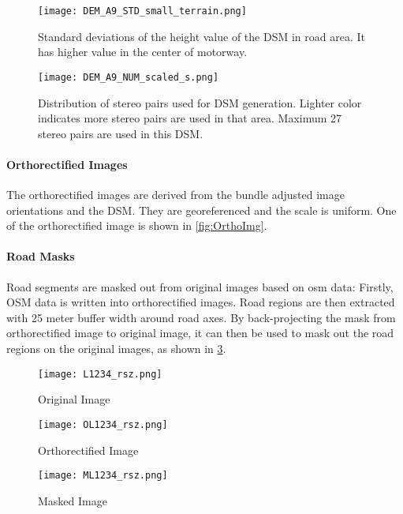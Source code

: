 \begin{figure}%
  \centering
  \texttt{[image: DEM\_A9\_STD\_small\_terrain.png]}
  \caption{Standard deviations of the height value of the DSM in road area. It has higher value in the center of motorway.}
  \label{fig:DSMstd}
\end{figure}

\begin{figure}%
  \centering
  \texttt{[image: DEM\_A9\_NUM\_scaled\_s.png]}
  \caption{Distribution of stereo pairs used for DSM generation. Lighter color indicates more stereo pairs are used in that area. Maximum 27 stereo pairs are used in this DSM.}
  \label{fig:DSMnumber}
\end{figure}


\paragraph{Orthorectified Images}
The orthorectified images are derived from the bundle adjusted image orientations and the DSM. They are georeferenced and the scale is uniform. One of the orthorectified image is shown in \cref{fig:OrthoImg}.

\paragraph{Road Masks}
Road segments are masked out from original images based on \gls{osm} data: Firstly, OSM data is written into orthorectified images. Road regions are then extracted with 25 meter buffer width around road axes. By back-projecting the mask from orthorectified image to original image, it can then be used to mask out the road regions on the original images, as shown in \cref{fig:MaskedImg}.

\begin{figure}%
  \parbox{.45\linewidth}{
    \centering
    \texttt{[image: L1234\_rsz.png]}
    \caption{Original Image}
    \label{fig:OriImg}
  }
  \hfill
  \parbox{.45\linewidth}{
    \centering
    \texttt{[image: OL1234\_rsz.png]}
    \caption{Orthorectified Image}
    \label{fig:OrthoImg}
  }
    \centering
    \texttt{[image: ML1234\_rsz.png]}
    \caption{Masked Image}
    \label{fig:MaskedImg}
\end{figure}


